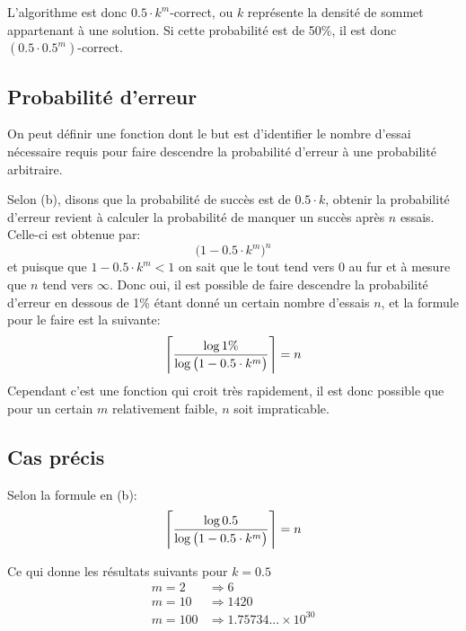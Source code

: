 \documentclass{article}
\DeclarePairedDelimiter{\ceil}{\lceil}{\rceil}
\begin{document}
L'algorithme est donc $0.5 \cdot k^m$-correct, ou $k$ représente la densité de sommet appartenant à une solution. Si cette probabilité est de 50\%, il est donc $(0.5 \cdot 0.5^m)$-correct.

\subsection{Probabilité d'erreur}
On peut définir une fonction dont le but est d'identifier le nombre d'essai nécessaire requis pour faire descendre la probabilité d'erreur à une probabilité arbitraire.

Selon (b), disons que la probabilité de succès est de $0.5\cdot k$, obtenir la probabilité d'erreur revient à calculer la probabilité de manquer un succès après $n$ essais. Celle-ci est obtenue par:
$$\big(1 - 0.5\cdot k^m\big)^n$$
et puisque que $1 - 0.5\cdot k^m < 1$ on sait que le tout tend vers 0 au fur et à mesure que $n$ tend vers $\infty$. Donc oui, il est possible de faire descendre la probabilité d'erreur en dessous de 1\% étant donné un certain nombre d'essais $n$, et la formule pour le faire est la suivante:
$$\ceil[\Bigg]{\frac{\log 1\%}{\log\big(1 - 0.5\cdot k^m\big)}} = n$$
Cependant c'est une fonction qui croit très rapidement, il est donc possible que pour un certain $m$ relativement faible, $n$ soit impraticable.

\subsection{Cas précis}
Selon la formule en (b):
\begin{equation*}
  \ceil[\Bigg]{\frac{\log 0.5}{\log\big(1 - 0.5\cdot k^m\big)}} = n
\end{equation*}

Ce qui donne les résultats suivants pour $k=0.5$
\begin{align*}
  m = 2 &\Rightarrow 6\\
  m = 10 &\Rightarrow 1420\\
  m = 100 &\Rightarrow 1.75734... \times 10^{30}
\end{align*}
\end{document}
